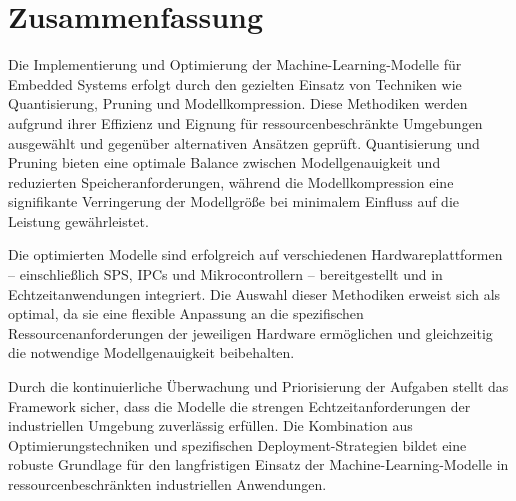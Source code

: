 \section{Zusammenfassung}

Die Implementierung und Optimierung der Machine-Learning-Modelle für Embedded Systems erfolgt durch den gezielten Einsatz von Techniken wie Quantisierung, 
Pruning und Modellkompression. Diese Methodiken werden aufgrund ihrer Effizienz und Eignung für ressourcenbeschränkte Umgebungen ausgewählt und gegenüber 
alternativen Ansätzen geprüft. Quantisierung und Pruning bieten eine optimale Balance zwischen Modellgenauigkeit und reduzierten Speicheranforderungen, 
während die Modellkompression eine signifikante Verringerung der Modellgröße bei minimalem Einfluss auf die Leistung gewährleistet.

Die optimierten Modelle sind erfolgreich auf verschiedenen Hardwareplattformen – einschließlich SPS, IPCs und Mikrocontrollern – bereitgestellt und in 
Echtzeitanwendungen integriert. Die Auswahl dieser Methodiken erweist sich als optimal, da sie eine flexible Anpassung an die spezifischen 
Ressourcenanforderungen der jeweiligen Hardware ermöglichen und gleichzeitig die notwendige Modellgenauigkeit beibehalten.

Durch die kontinuierliche Überwachung und Priorisierung der Aufgaben stellt das Framework sicher, dass die Modelle die strengen Echtzeitanforderungen der 
industriellen Umgebung zuverlässig erfüllen. Die Kombination aus Optimierungstechniken und spezifischen Deployment-Strategien bildet eine robuste Grundlage 
für den langfristigen Einsatz der Machine-Learning-Modelle in ressourcenbeschränkten industriellen Anwendungen.
